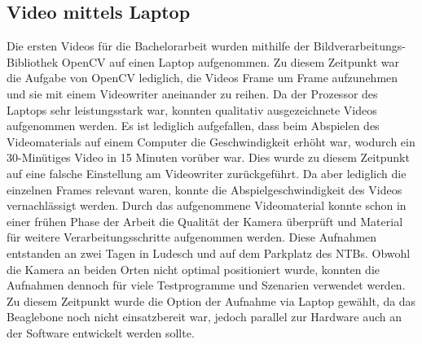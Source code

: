 \subsection{Video mittels Laptop}
Die ersten Videos für die Bachelorarbeit wurden mithilfe der Bildverarbeitungs-Bibliothek OpenCV auf einen Laptop aufgenommen. Zu diesem Zeitpunkt war die Aufgabe von OpenCV lediglich, die Videos Frame um Frame aufzunehmen und sie mit einem Videowriter aneinander zu reihen. Da der Prozessor des Laptops sehr leistungsstark war, konnten qualitativ ausgezeichnete Videos aufgenommen werden. Es ist lediglich aufgefallen, dass beim Abspielen des Videomaterials auf einem Computer die Geschwindigkeit erhöht war, wodurch ein 30-Minütiges Video in 15 Minuten vorüber war. Dies wurde zu diesem Zeitpunkt auf eine falsche Einstellung am Videowriter zurückgeführt. Da aber lediglich die einzelnen Frames relevant waren, konnte die Abspielgeschwindigkeit des Videos vernachlässigt werden. Durch das aufgenommene Videomaterial konnte schon in einer frühen Phase der Arbeit die Qualität der Kamera überprüft und Material für weitere Verarbeitungsschritte aufgenommen werden. Diese Aufnahmen entstanden an zwei Tagen in Ludesch und auf dem Parkplatz des NTBs. Obwohl die Kamera an beiden Orten nicht optimal positioniert wurde, konnten die Aufnahmen dennoch für viele Testprogramme und Szenarien verwendet werden. Zu diesem Zeitpunkt wurde die Option der Aufnahme via Laptop gewählt, da das Beaglebone noch nicht einsatzbereit war, jedoch parallel zur Hardware auch an der Software entwickelt werden sollte.